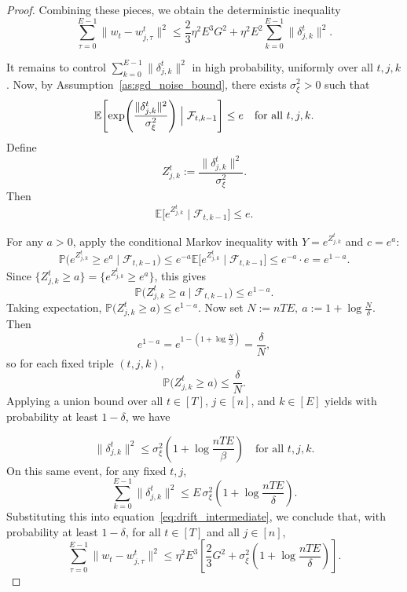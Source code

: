 \documentclass[10pt,a4paper]{amsart}
\def\eqref#1{equation~\ref{#1}}
\begin{document}
\begin{proof}
Combining these pieces, we obtain the deterministic inequality
\begin{equation}
    \label{eq:drift_intermediate}
    \sum_{\tau=0}^{E-1} \|w_t - w_{j,\tau}^t\|^2
    \le
    \frac{2}{3}\eta^2 E^3 G^2
    +
    \eta^2 E^2 \sum_{k=0}^{E-1}\|\delta_{j,k}^t\|^2.
\end{equation}

It remains to control $\sum_{k=0}^{E-1}\|\delta_{j,k}^t\|^2$ in high probability, uniformly over all $t,j,k$. Now, by Assumption~\ref{as:sgd_noise_bound}, there exists $\sigma_\xi^2>0$ such that
\[
\mathbb{E}\!\left[
    \exp\!\left(\frac{\|\delta_{j,k}^t\|^2}{\sigma_\xi^2}\right)
    \Bigm| \mathcal{F}_{t,k-1}
\right] \le e
\quad
\text{for all } t,j,k.
\]
Define
\[
Z_{j,k}^t := \frac{\|\delta_{j,k}^t\|^2}{\sigma_\xi^2}.
\]
Then
\[
\mathbb{E}\bigl[e^{Z_{j,k}^t} \mid \mathcal{F}_{t,k-1}\bigr] \le e.
\]

For any $a>0$, apply the conditional Markov inequality with $Y = e^{Z_{j,k}^t}$ and $c = e^a$:
\[
\mathbb{P}\bigl(e^{Z_{j,k}^t} \ge e^a \mid \mathcal{F}_{t,k-1}\bigr)
\le e^{-a} \mathbb{E}\bigl[e^{Z_{j,k}^t} \mid \mathcal{F}_{t,k-1}\bigr]
\le e^{-a} \cdot e
= e^{1-a}.
\]
Since $\{Z_{j,k}^t \ge a\} = \{e^{Z_{j,k}^t} \ge e^a\}$, this gives
\[
\mathbb{P}\bigl(Z_{j,k}^t \ge a \mid \mathcal{F}_{t,k-1}\bigr)
\le e^{1-a}.
\]
Taking expectation,
$
\mathbb{P}\bigl(Z_{j,k}^t \ge a\bigr) \le e^{1-a}.
$
Now set
$
N := nTE,
\ 
a := 1 + \log\frac{N}{\delta}.
$
Then
\[
e^{1-a} = e^{1-(1+\log\frac{N}{\beta})}
= \frac{\delta}{N},
\]
so for each fixed triple $(t,j,k)$,
\[
\mathbb{P}\bigl(Z_{j,k}^t \ge a\bigr) \le \frac{\delta}{N}.
\]
Applying a union bound over all $t \in [T]$, $j \in [n]$, and $k \in [E]$ yields with probability at least $1-\delta$, we have

\begin{equation}
\label{eq:unif_prob_grad}
    \|\delta_{j,k}^t\|^2 \le \sigma_\xi^2 \left(1 + \log\frac{nTE}{\beta}\right)
 \quad\text{for all } t,j,k.
\end{equation}
On this same event, for any fixed $t,j$,
\[
\sum_{k=0}^{E-1}\|\delta_{j,k}^t\|^2
\le E \,\sigma_\xi^2 \left(1 + \log\frac{nTE}{\delta}\right).
\]
Substituting this into \eqref{eq:drift_intermediate}, we conclude that, with probability at least $1-\delta$, for all $t \in [T]$ and all $j \in [n]$,
\[
\sum_{\tau=0}^{E-1} \|w_t - w_{j,\tau}^t\|^2
\le
\eta^2 E^3\left[
\frac{2}{3}G^2 + \sigma_\xi^2\left(1 + \log\frac{nTE}{\delta}\right)
\right].
\]
\end{proof}
\end{document}
